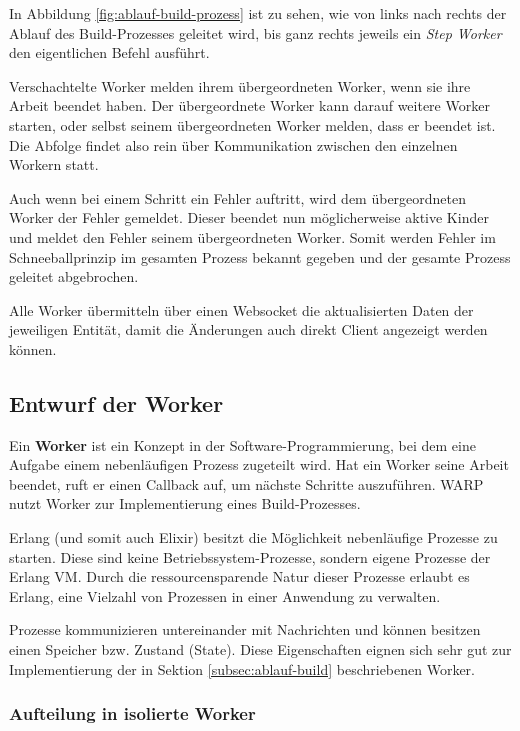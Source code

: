 In Abbildung \ref{fig:ablauf-build-prozess} ist zu sehen, wie von links nach rechts der Ablauf des Build-Prozesses geleitet wird, bis ganz rechts jeweils ein \emph{Step Worker} den eigentlichen Befehl ausführt.

Verschachtelte Worker melden ihrem übergeordneten Worker, wenn sie ihre Arbeit beendet haben. Der übergeordnete Worker kann darauf weitere Worker starten, oder selbst seinem übergeordneten Worker melden, dass er beendet ist. Die Abfolge findet also rein über Kommunikation zwischen den einzelnen Workern statt.

Auch wenn bei einem Schritt ein Fehler auftritt, wird dem übergeordneten Worker der Fehler gemeldet. Dieser beendet nun möglicherweise aktive Kinder und meldet den Fehler seinem übergeordneten Worker. Somit werden Fehler im Schneeballprinzip im gesamten Prozess bekannt gegeben und der gesamte Prozess geleitet abgebrochen.

Alle Worker übermitteln über einen Websocket die aktualisierten Daten der jeweiligen Entität, damit die Änderungen auch direkt Client angezeigt werden können.

\subsection{Entwurf der Worker}

Ein \textbf{Worker} ist ein Konzept in der Software-Programmierung, bei dem eine Aufgabe einem nebenläufigen Prozess zugeteilt wird. Hat ein Worker seine Arbeit beendet, ruft er einen Callback auf, um nächste Schritte auszuführen. WARP nutzt Worker zur Implementierung eines Build-Prozesses.

Erlang (und somit auch Elixir) besitzt die Möglichkeit nebenläufige Prozesse zu starten. Diese sind keine Betriebssystem-Prozesse, sondern eigene Prozesse der Erlang VM. Durch die ressourcensparende Natur dieser Prozesse erlaubt es Erlang, eine Vielzahl von Prozessen in einer Anwendung zu verwalten. \citep[133]{Armstrong2007}

Prozesse kommunizieren untereinander mit Nachrichten und können besitzen einen Speicher bzw. Zustand (State). Diese Eigenschaften eignen sich sehr gut zur Implementierung der in Sektion \ref{subsec:ablauf-build} beschriebenen Worker.

\subsubsection{Aufteilung in isolierte Worker}
\label{subsec:aufteilung-der-worker}

